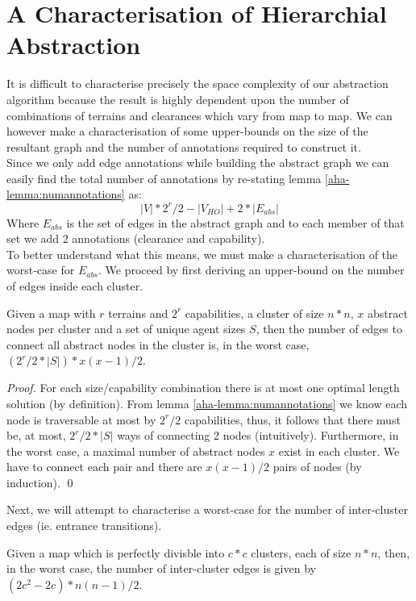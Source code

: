 \section{A Characterisation of Hierarchial Abstraction}
It is difficult to characterise precisely the space complexity of our abstraction algorithm because the result is highly dependent upon the number of combinations of terrains and clearances which vary from map to map. We can however make a characterisation of some upper-bounds on the size of the resultant graph and the number of annotations required to construct it. \\
Since we only add edge annotations while building the abstract graph we can easily find the total number of annotations by re-stating lemma \ref{aha-lemma:numannotations} as: 
\begin{equation}
\label{aha-eq:totalannotations}
|V|*2^r/2 - |V_{HO}| + 2*|E_{abs}|
\end{equation}
Where $E_{abs}$ is the set of edges in the abstract graph and to each member of that set we add 2 annotations (clearance and capability). \\
To better understand what this means, we must make a characterisation of the worst-case for $E_{abs}$. We proceed by first deriving an upper-bound on the number of edges inside each cluster. 
\begin{lemma}
\label{aha-lemma:maxedgesincluster}
Given a map with $r$ terrains and $2^r$ capabilities, a cluster of size $n*n$, $x$ abstract nodes per cluster and a set of unique agent sizes $S$, then the number of edges to connect all abstract nodes in the cluster is, in the worst case, $(2^r/2 * |S|) * x(x-1)/2$.
\end{lemma}

\begin{proof}
For each size/capability combination there is at most one optimal length solution (by definition). From lemma \ref{aha-lemma:numannotations} we know each node is traversable at most by $2^r/2$ capabilities, thus, it follows that there must be, at most, $2^r/2 * |S|$ ways of connecting 2 nodes (intuitively). Furthermore, in the worst case, a maximal number of abstract nodes $x$ exist in each cluster. We have to connect each pair and there are $x(x-1)/2$ pairs of nodes (by induction). \qed
\end{proof}

Next, we will attempt to characterise a worst-case for the number of inter-cluster edges (ie. entrance transitions). 
\begin{lemma}
\label{aha-lemma:maxtransitions}
Given a map which is perfectly divisble into $c*c$ clusters, each of size $n*n$, then, in the worst case, the number of inter-cluster edges is given by $(2c^2 - 2c)*n(n-1)/2$.
\end{lemma}

